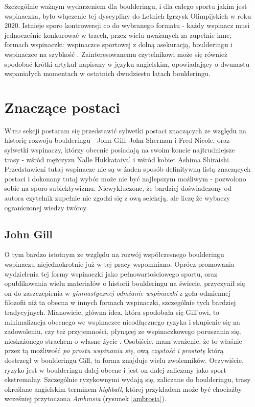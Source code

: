 \documentclass{article}
\begin{document}
Szczególnie ważnym wydarzeniem dla boulderingu, i dla całego sportu jakim jest wspinaczka, było włączenie tej dyscypliny do Letnich Igrzysk Olimpijskich w roku 2020. Istnieje sporo kontrowersji co do wybranego formatu - każdy wspinacz musi jednocześnie konkurować w trzech, przez wielu uważanych za zupełnie inne, formach wspinaczki: wspinaczce sportowej z dolną asekuracją, boulderingu i wspinaczce na szybkość \cite{olympics}. Zainteresowanemu czytelnikowi może się również spodobać krótki artykuł \cite{great-moments} napisany w języku angielskim, opowiadający o dwunastu wspaniałych momentach w ostatnich dwudziestu latach boulderingu.


\section{Znaczące postaci}
\lettrine[lines=2]{W}{tej} sekcji postaram się przedstawić sylwetki postaci znaczących ze względu na historię rozwoju boulderingu - John Gill, John Sherman i Fred Nicole, oraz sylwetki wspinaczy, którzy obecnie posiadają na swoim koncie najtrudniejsze trasy - wśród mężczyzn Nalle Hukkataival i wśród kobiet Ashima Shiraishi. Przedstawieni tutaj wspinacze nie są w żaden sposób definitywną listą znaczących postaci i dokonany tutaj wybór może nie być najlepszym możliwym - pozwolono sobie na sporo subiektywizmu. Niewykluczone, że bardziej doświadczony od autora czytelnik zupełnie nie zgodzi się z ową selekcją, ale liczę że wybaczy ograniczonej wiedzy twórcy.

\subsection{John Gill}
\label{jg}
O tym bardzo istotnym ze względu na rozwój współczesnego boulderingu wspinaczu niejednokrotnie już w tej pracy wspomniano. Oprócz promowania wydzielenia tej formy wspinaczki jako pełnowartościowego sportu, oraz opublikowania wielu materiałów o historii boulderingu na świecie, przyczynił się on do zaszczepienia w \textit{gimnastycznej odmianie wspinaczki} z goła odmiennej filozofii niż ta obecna w innych formach wspinaczki, szczególnie tych bardziej tradycyjnych. Mianowicie, główna idea, która spodobała się Gill'owi, to minimalizacja obecnego we wspinaczce nieodłącznego ryzyka i skupienie się na zadowoleniu, czy też przyjemności, płynącej ze wspinaczkowego poruszania się, nieskażonego strachem o własne życie \cite{gill-philosophy}. Osobiście, mam wrażenie, że to właśnie przez tą możliwość \textit{po prostu wspinania się}, ową \textit{czystość i prostotę} którą dostrzegł w boulderingu Gill, ta forma znajduje wielu zwolenników. Oczywiście, ryzyko jest w boulderingu dalej obecne i jest on dalej zaliczany jako sport ekstremalny. Szczególnie ryzykownymi wydają się, zaliczane do boulderingu, trasy określane angielskim terminem \textit{highball}, której przykładem może być chociażby wcześniej przytoczona \textit{Ambrosia} (rysunek \ref{ambrosia}).
\end{document}
